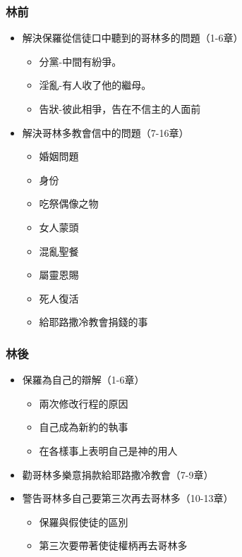 \subsubsection{林前}%
\begin{itemize}%
\itemsep-.25em 
\item 解決保羅從信徒口中聽到的哥林多的問題（1-6章）
\begin{itemize}
\itemsep-.25em 
\item 分黨-中間有紛爭。
\item 淫亂-有人收了他的繼母。
\item 告狀-彼此相爭，告在不信主的人面前
\end{itemize}
\item  解決哥林多教會信中的問題（7-16章）
\begin{itemize}
\itemsep-.25em 
\item 婚姻問題
\item 身份
\item 吃祭偶像之物
\item 女人蒙頭
\item 混亂聖餐
\item 屬靈恩賜
\item 死人復活
\item 給耶路撒冷教會捐錢的事
\end{itemize}
\end{itemize}

\subsubsection{林後}%
\begin{itemize}%
\itemsep-.25em 
\item 保羅為自己的辯解（1-6章）
\begin{itemize}
\itemsep-.25em 
\item 兩次修改行程的原因
\item 自己成為新約的執事
\item 在各樣事上表明自己是神的用人
\end{itemize}
\item 勸哥林多樂意捐款給耶路撒冷教會（7-9章）
\item 警告哥林多自己要第三次再去哥林多（10-13章）
\begin{itemize}
\itemsep-.25em 
\item 保羅與假使徒的區別
\item 第三次要帶著使徒權柄再去哥林多
\end{itemize}
\end{itemize}




